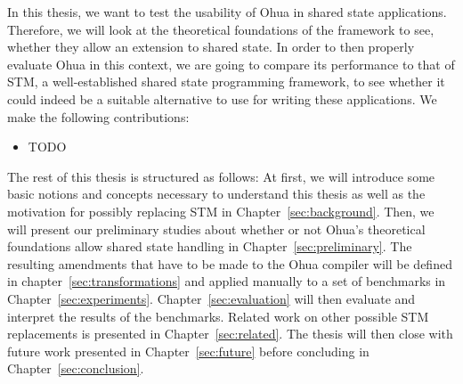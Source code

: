 In this thesis, we want to test the usability of Ohua in shared state applications.
Therefore, we will look at the theoretical foundations of the framework to see, whether they allow an extension to shared state.
In order to then properly evaluate Ohua in this context, we are going to compare its performance to that of STM, a well-established shared state programming framework, to see whether it could indeed be a suitable alternative to use for writing these applications.
We make the following contributions:

\begin{itemize}
    \item TODO
\end{itemize}

The rest of this thesis is structured as follows:
At first, we will introduce some basic notions and concepts necessary to understand this thesis as well as the motivation for possibly replacing STM in Chapter~\ref{sec:background}.
Then, we will present our preliminary studies about whether or not Ohua's theoretical foundations allow shared state handling in Chapter~\ref{sec:preliminary}.
The resulting amendments that have to be made to the Ohua compiler will be defined in chapter~\ref{sec:transformations} and applied manually to a set of benchmarks in Chapter~\ref{sec:experiments}.
Chapter~\ref{sec:evaluation} will then evaluate and interpret the results of the benchmarks.
Related work on other possible STM replacements is presented in Chapter~\ref{sec:related}.
The thesis will then close with future work presented in Chapter~\ref{sec:future} before concluding in Chapter~\ref{sec:conclusion}.
